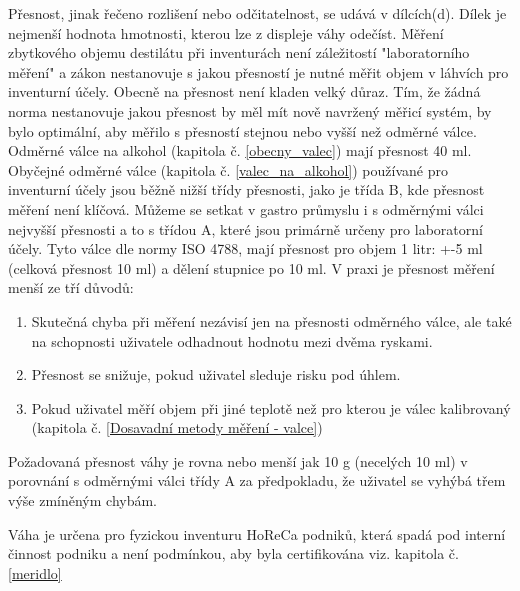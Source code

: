 Přesnost, jinak řečeno rozlišení nebo odčitatelnost, se udává v dílcích(d). Dílek je nejmenší hodnota hmotnosti, kterou lze z displeje váhy odečíst.\cite{vazivost} Měření zbytkového objemu destilátu při inventurách není záležitostí "laboratorního měření" a zákon nestanovuje s jakou přesností je nutné měřit objem v láhvích pro inventurní účely. Obecně na 
přesnost není kladen velký důraz. Tím, že žádná norma nestanovuje jakou přesnost by měl mít nově navržený měřicí systém, by bylo optimální, aby měřilo s přesností stejnou nebo vyšší než odměrné válce. Odměrné válce na alkohol (kapitola č. \ref{obecny_valec}) mají přesnost 40 ml. Obyčejné odměrné válce (kapitola č. \ref{valec_na_alkohol}) používané pro inventurní účely jsou běžně nižší třídy přesnosti, jako je třída B, kde přesnost měření není klíčová. Můžeme se setkat v gastro průmyslu i s odměrnými válci nejvyšší přesnosti a to s třídou A, které jsou primárně určeny pro laboratorní účely. Tyto válce dle normy ISO 4788, mají přesnost pro objem 1 litr: +-5 ml (celková přesnost 10 ml) a dělení stupnice po 10 ml. V praxi je přesnost měření menší ze tří důvodů:
\begin{enumerate}
    \item Skutečná chyba při měření nezávisí jen na přesnosti odměrného válce, ale také na schopnosti uživatele odhadnout hodnotu mezi dvěma ryskami.
    \item Přesnost se snižuje, pokud uživatel sleduje risku pod úhlem.
    \item Pokud uživatel měří objem při jiné teplotě než pro kterou je válec kalibrovaný (kapitola č.  \ref{Dosavadní metody měření - valce})
\end{enumerate}
Požadovaná přesnost váhy je rovna nebo menší jak 10 g (necelých 10 ml) v porovnání s odměrnými válci třídy A za předpokladu, že uživatel se vyhýbá třem výše zmíněným chybám.


Váha je určena pro fyzickou inventuru HoReCa podniků, která spadá pod interní činnost podniku a není podmínkou, aby byla certifikována viz. kapitola č.\ref{meridlo}

